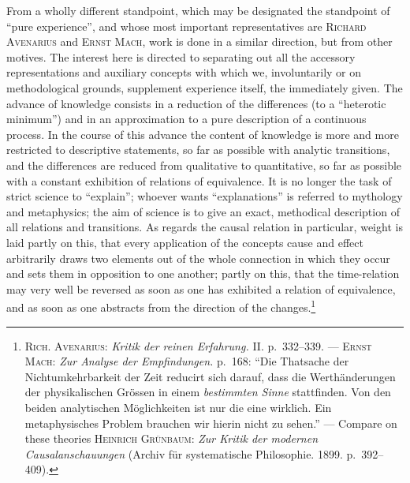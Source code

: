 \documentclass[12pt,a4paper]{book}
\newcommand{\opage}[1]{\marginnote{\footnotesize\textit{[#1]}}}
\begin{document}
From a wholly different standpoint, which may be designated the standpoint of
``\opage{45}pure experience'', and whose most important representatives are
\textsc{Richard Avenarius} and \textsc{Ernst Mach}, work is done in a similar
direction, but from other motives. The interest here is directed to separating
out all the accessory representations and auxiliary concepts with which we,
involuntarily or on methodological grounds, supplement experience itself, the
immediately given. The advance of knowledge consists in a reduction of the
differences (to a ``heterotic minimum'') and in an approximation to a pure
description of a continuous process. In the course of this advance the content of
knowledge is more and more restricted to descriptive statements, so far as
possible with analytic transitions, and the differences are reduced from
qualitative to quantitative, so far as possible with a constant exhibition of
relations of equivalence. It is no longer the task of strict science to
``explain''; whoever wants ``explanations'' is referred to mythology and
metaphysics; the aim of science is to give an exact, methodical description of
all relations and transitions. As regards the causal relation in particular,
weight is laid partly on this, that every application of the concepts cause and
effect arbitrarily draws two elements out of the whole connection in which they
occur and sets them in opposition to one another; partly on this, that the
time-relation may very well be reversed as soon as one has exhibited a relation
of equivalence, and as soon as one abstracts from the direction of the
changes.\footnote{\textsc{\opage{89}Rich. Avenarius}: \textit{Kritik der reinen Erfahrung.}
II. p.~332--339. --- \textsc{Ernst Mach}: \textit{Zur Analyse der
Empfindungen.} p.~168: ``Die Thatsache der Nichtumkehrbarkeit der Zeit reducirt
sich darauf, dass die Werthänderungen der physikalischen Grössen in einem
\textit{bestimmten Sinne} stattfinden. Von den beiden analytischen Möglichkeiten
ist nur die eine wirklich. Ein metaphysisches Problem brauchen wir hierin nicht
zu sehen.'' --- Compare on these theories \textsc{Heinrich Grünbaum}:
\textit{Zur Kritik der modernen Causalanschauungen} (Archiv für systematische
Philosophie. 1899. p.~392--409).}
\end{document}
